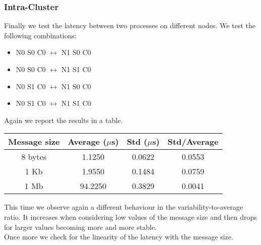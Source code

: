 \subsubsection{Intra-Cluster}
    Finally we test the latency between two processes on different nodes.
    We test the following combinations:
    \begin{itemize}
        \item N0 S0 C0 $\leftrightarrow$ N1 S0 C0
        \item N0 S0 C0 $\leftrightarrow$ N1 S1 C0
        \item N0 S1 C0 $\leftrightarrow$ N1 S0 C0
        \item N0 S1 C0 $\leftrightarrow$ N1 S1 C0
    \end{itemize}
    Again we report the results in a table.
    \begin{table}[H]
        \centering
        \begin{tabular}{|c|c|c|c|}
            \hline
            \textbf{Message size} & \textbf{Average ($\mu$s)} & \textbf{Std ($\mu$s)} & \textbf{Std/Average} \\
            \hline
            8 bytes & 1.1250 & 0.0622 & 0.0553 \\
            1 Kb & 1.9550 & 0.1484 & 0.0759 \\
            1 Mb & 94.2250 & 0.3829 & 0.0041 \\
            \hline
        \end{tabular}
    \end{table}
    This time we observe again a different behaviour in the variability-to-average
    ratio. It increases when considering low values of the message size and
    then drops for larger values becoming more and more stable.\\
    Once more we check for the linearity of the latency with the message size.
